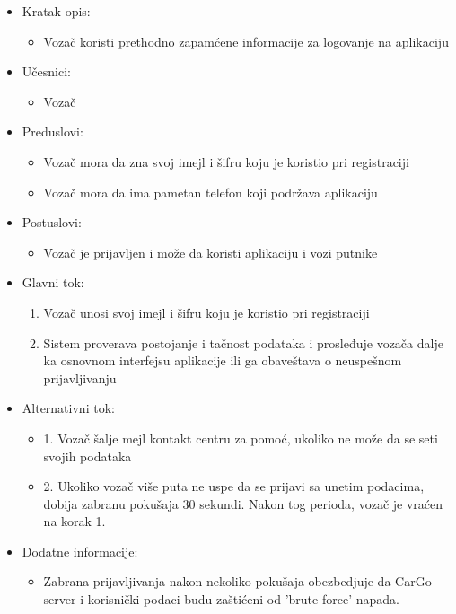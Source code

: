 \begin{itemize}
    \item Kratak opis:
        \begin{itemize}
            \item Vozač koristi prethodno zapamćene informacije za logovanje na aplikaciju
        \end{itemize}
    \item Učesnici:
        \begin{itemize}
            \item Vozač
        \end{itemize}
    \item Preduslovi:
        \begin{itemize}
            \item Vozač mora da zna svoj imejl i šifru koju je koristio pri registraciji
            \item Vozač mora da ima pametan telefon koji podržava aplikaciju
        \end{itemize}
    \item Postuslovi:
        \begin{itemize}
            \item Vozač je prijavljen i može da koristi aplikaciju i vozi putnike
        \end{itemize}
    \item Glavni tok:
        \begin{enumerate}
            \item Vozač unosi svoj imejl i šifru koju je koristio pri registraciji
            \item Sistem proverava postojanje i tačnost podataka i prosleđuje vozača dalje ka osnovnom interfejsu aplikacije ili ga obaveštava o neuspešnom prijavljivanju
        \end{enumerate}
    \item Alternativni tok:
        \begin{itemize}
            \item 1. Vozač šalje mejl kontakt centru za pomoć, ukoliko ne može da se seti svojih podataka
            \item 2. Ukoliko vozač više puta ne uspe da se prijavi sa unetim podacima, dobija zabranu pokušaja 30 sekundi. Nakon tog perioda, vozač je vraćen na korak 1.
        \end{itemize}
    \item Dodatne informacije:
        \begin{itemize}
            \item Zabrana prijavljivanja nakon nekoliko pokušaja obezbedjuje da CarGo server i korisnički podaci budu zaštićeni od 'brute force' napada.
        \end{itemize}
\end{itemize}



